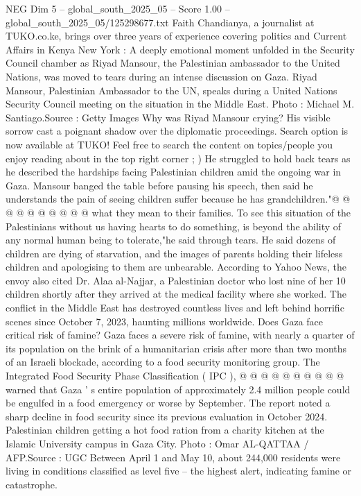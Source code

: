 \begin{textsample}{NEG Dim 5 – global\_south\_2025\_05 – Score 1.00 – global\_south\_2025\_05/125298677.txt}  \label{ex:f5_neg_338}
Faith Chandianya, a journalist at TUKO.co.ke, brings over three years of experience covering politics and Current Affairs in Kenya New York : A deeply emotional moment unfolded in the Security Council chamber as Riyad Mansour, the Palestinian ambassador to the United Nations, was moved to tears during an intense discussion on Gaza.
Riyad Mansour, Palestinian Ambassador to the UN, speaks during a United Nations Security Council meeting on the situation in the Middle East.
Photo : Michael M.
Santiago.Source : Getty Images Why was Riyad Mansour crying?
His visible sorrow cast a poignant shadow over the diplomatic proceedings.
Search option is now available at TUKO!
Feel free to search the content on topics/people you enjoy reading about in the top right corner ; ) He struggled to hold back tears as he described the hardships facing Palestinian children amid the ongoing war in Gaza.
Mansour banged the table before pausing his speech, then said he understands the pain of seeing children suffer because he has grandchildren."@ @ @ @ @ @ @ @ @ @ what they mean to their families.
To see this situation of the Palestinians without us having hearts to do something, is beyond the ability of any normal human being to tolerate,"he said through tears.
He said dozens of children are dying of starvation, and the images of parents holding their lifeless children and apologising to them are unbearable.
According to Yahoo News, the envoy also cited Dr.
Alaa al-Najjar, a Palestinian doctor who lost nine of her 10 children shortly after they arrived at the medical facility where she worked.
The conflict in the Middle East has destroyed countless lives and left behind horrific scenes since October 7, 2023, haunting millions worldwide.
Does Gaza face critical risk of famine?
Gaza faces a severe risk of famine, with nearly a quarter of its population on the brink of a humanitarian crisis after more than two months of an Israeli blockade, according to a food security monitoring group.
The Integrated Food Security Phase Classification ( IPC ), @ @ @ @ @ @ @ @ @ @ warned that Gaza ' s entire population of approximately 2.4 million people could be engulfed in a food emergency or worse by September.
The report noted a sharp decline in food security since its previous evaluation in October 2024.
Palestinian children getting a hot food ration from a charity kitchen at the Islamic University campus in Gaza City.
Photo : Omar AL-QATTAA / AFP.Source : UGC Between April 1 and May 10, about 244,000 residents were living in conditions classified as level five -- the highest alert, indicating famine or catastrophe.

\end{textsample}
